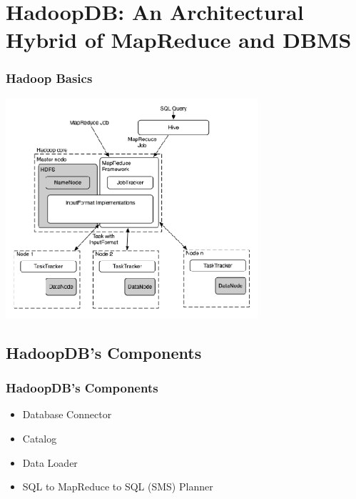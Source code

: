 \documentclass{beamer}
\begin{document}

\section{HadoopDB:  An Architectural Hybrid of MapReduce and DBMS}

\begin{frame}
  \frametitle{Hadoop Basics}
      \begin{center}
      \includegraphics[width=0.7\textwidth]{Hadoop_Basics}
    \end{center}
\end{frame}

\subsection{HadoopDB's Components}
\begin{frame}
  \frametitle{HadoopDB's Components}
  \begin{itemize}
  \item Database Connector
  \item Catalog
  \item Data Loader
  \item SQL to MapReduce to SQL (SMS) Planner
  \end{itemize}
\end{frame}
\end{document}
